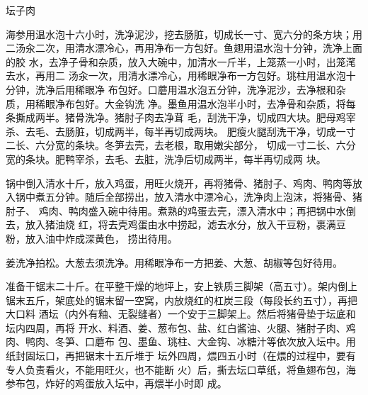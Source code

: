 \begin{recipe}{坛子肉}

\ingredients


\preparation

\step 海参用温水泡十六小时，洗净泥沙，挖去肠脏，切成长一寸、宽六分的条方块；用
二汤汆二次，用清水漂冷心，再用净布一方包好。鱼翅用温水泡十分钟，洗净上面的胶
水，去净子骨和杂质，放入大碗中，加清水一斤半，上笼蒸一小时，出笼滗去水，再用二
汤汆一次，用清水漂冷心，用稀眼净布一方包好。珧柱用温水泡十分钟，洗净后用稀眼净
布包好。口蘑用温水泡五分钟，洗净泥沙，去净根和杂质，用稀眼净布包好。大金钩洗
净。墨鱼用温水泡半小时，去净骨和杂质，将每条撕成两半。猪骨洗净。猪肘子肉去净茸
毛，刮洗干净，切成四大块。肥母鸡宰杀、去毛、去肠脏，切成两半，每半再切成两块。
肥瘦火腿刮洗干净，切成一寸二长、六分宽的条块。冬笋去壳，去老根，取用嫩尖部分，
切成一寸二长、六分宽的条块。肥鸭宰杀，去毛、去脏，洗净后切成两半，每半再切成两
块。

\step 锅中倒入清水十斤，放入鸡蛋，用旺火烧开，再将猪骨、猪肘子、鸡肉、鸭肉等放
入锅中煮五分钟。随后全部捞出，放入清水中漂冷心，洗净肉上泡沫，将猪骨、猪肘子、
鸡肉、鸭肉盛入碗中待用。煮熟的鸡蛋去壳，漂入清水中；再把锅中水倒去，放入猪油烧
红，将去壳鸡蛋由水中捞起，滤去水分，放入干豆粉，裹满豆粉，放入油中炸成深黄色，
捞出待用。

\step 姜洗净拍松。大葱去须洗净。用稀眼净布一方把姜、大葱、胡椒等包好待用。

\step 准备干锯末二十斤。在平整干燥的地坪上，安上铁质三脚架（高五寸）。架内倒上
锯末五斤，架底处的锯末留一空窝，内放烧红的杠炭三段（每段长约五寸），再把大口料
酒坛（内外有釉、无裂缝者）一个安于三脚架上。然后将猪骨垫于坛底和坛内四周，再将
开水、料酒、姜、葱布包、盐、红白酱油、火腿、猪肘子肉、鸡肉、鸭肉、冬笋、口蘑布
包、墨鱼、珧柱、大金钩、冰糖汁等依次放入坛中。用纸封固坛口，再把锯末十五斤堆于
坛外四周，煨四五小时（在煨的过程中，要有专人负责看火，不能用旺火，也不能断
火）后，撕去坛口草纸，将鱼翅布包，海参布包，炸好的鸡蛋放入坛中，再煨半小时即
成。


\end{recipe}
